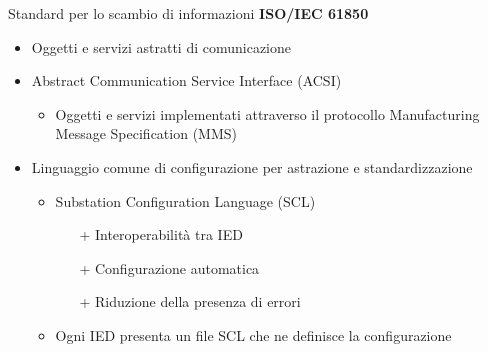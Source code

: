 \begin{frame}{Standard per lo scambio di informazioni}
\textbf{ISO/IEC 61850}
	\begin{itemize}[<+- | alert@+>]
		\item Oggetti e servizi astratti di comunicazione %
		\item Abstract Communication Service Interface (ACSI)
			\begin{itemize}[<+- | alert@+>]
				\item Oggetti e servizi implementati attraverso il protocollo Manufacturing Message Specification (MMS) 
			\end{itemize}
		\item Linguaggio comune di configurazione per astrazione e standardizzazione
		\begin{itemize}[<+- | alert@+>]
			\item Substation Configuration Language (SCL)%
			\begin{itemize}[<+- | alert@+>]
			\item[+] Interoperabilità tra IED
			\item[+] Configurazione automatica
			\item[+] Riduzione della presenza di errori
			\end{itemize}
			\item Ogni IED presenta un file SCL che ne definisce la configurazione
		\end{itemize}
	\end{itemize}		
\end{frame}

